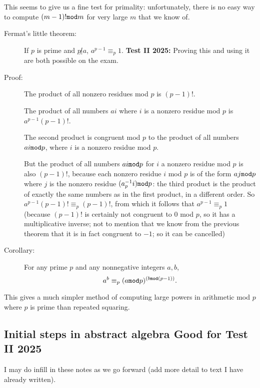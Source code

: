 \documentclass[12pt]{article}
\begin{document}
This seems to give us a fine test for primality:  unfortunately, there is no easy way to compute $(m-1)! {\tt mod} m$ for very large $m$ that we know of.

\begin{description}

\item[Fermat's little theorem:]  If $p$ is prime and $p \not| a$, $a^{p-1}\equiv_p 1$.  {\bf Test II 2025:}  Proving this and using it are both possible on the exam.

\item[Proof:]  The product of all nonzero residues mod $p$ is $(p-1)!$.  

The product of all numbers $ai$ where $i$ is a nonzero residue mod $p$ is
$a^{p-1}(p-1)!$.  

The second product is congruent mod $p$ to the product of all numbers $ai {\tt mod} p$, where $i$ is a nonzero residue mod $p$.  

But the product of all numbers $ai {\tt mod} p$ for $i$ a nonzero residue mod $p$ is also $(p-1)!$, because each nonzero residue $i$ mod $p$ is of the form $aj {\tt mod}p$ where $j$ is the nonzero residue $(a^{-1}_pi ){\tt mod} p$:  the third product is the product of exactly the same numbers as in the first product, in a different order.  So $a^{p-1}(p-1)! \equiv_p (p-1)!$, from which it follows that
$a^{p-1}\equiv_p 1$ (because $(p-1)!$ is certainly not congruent to 0 mod $p$, so it has a multiplicative inverse;  not to mention that we know from the previous theorem that it is in fact congruent to $-1$;  so it can be cancelled)

\item[Corollary:]  For any prime $p$ and any nonnegative integers $a,b$, $$a^b \equiv_p (a {\tt mod} p)^{(b{\tt mod}(p-1))}.$$

\end{description}

This gives a much simpler method of computing large powers in arithmetic mod $p$ where $p$ is prime than repeated squaring.

\subsection{Initial steps in abstract algebra  Good for Test II 2025}

I may do infill in these notes as we go forward (add more detail to text I have already written).
\end{document}
